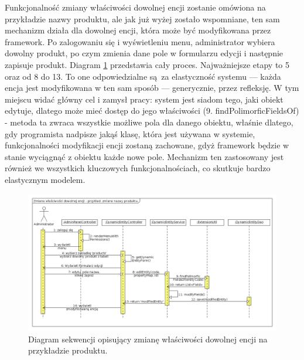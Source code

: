 Funkcjonalność zmiany właściwości dowolnej encji zostanie omówiona na przykładzie nazwy produktu, ale jak już wyżej zostało wspomniane, ten sam mechanizm działa dla dowolnej encji, która może być modyfikowana przez framework. Po zalogowaniu się i wyświetleniu menu, administrator wybiera dowolny produkt, po czym zmienia dane pole w formularzu edycji i następnie zapisuje produkt. Diagram \ref{zmianaWlEncji} przedstawia cały proces. Najważniejsze etapy to 5 oraz od 8 do 13. To one odpowiedzialne są za elastyczność systemu — każda encja jest modyfikowana w ten sam sposób — generycznie, przez refleksję. W tym miejscu widać główny cel i zamysł pracy: system jest siadom tego, jaki obiekt edytuje, dlatego może mieć dostęp do jego właściwości (9. findPolimorficFieldsOf) - metoda ta zwraca wszystkie możliwe pola dla danego obiektu, właśnie dlatego, gdy programista nadpisze jakąś klasę, która jest używana w systemie, funkcjonalności modyfikacji encji zostaną zachowane, gdyż framework będzie w stanie wyciągnąć z obiektu każde nowe pole. Mechanizm ten zastosowany jest również we wszystkich kluczowych funkcjonalnościach, co skutkuje bardzo elastycznym modelem.
\begin{figure}
	\begin{center}
		\includegraphics[scale=0.4]{zmianaWlEncji.png}
	\end{center}
	\caption{{\color{black}Diagram sekwencji opisujący zmianę właściwości dowolnej encji na przykładzie produktu.}} \label{zmianaWlEncji}
\end{figure}

